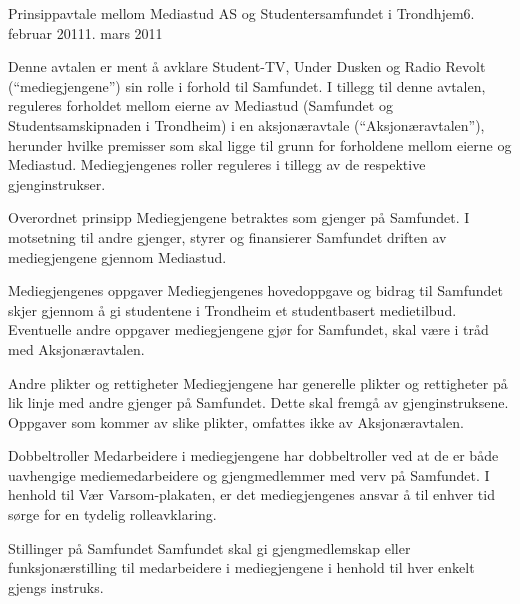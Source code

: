 \begin{instruks}{Prinsippavtale mellom Mediastud AS og Studentersamfundet i Trondhjem}{6. februar 2011}{1. mars 2011}


    Denne avtalen er ment å avklare Student-TV, Under Dusken og Radio Revolt
    (``mediegjengene'') sin rolle i forhold til Samfundet. I tillegg til denne avtalen, reguleres forholdet mellom
    eierne av Mediastud (Samfundet og Studentsamskipnaden i Trondheim) i en aksjonæravtale
    (``Aksjonæravtalen''), herunder hvilke premisser som skal ligge til grunn for forholdene mellom
    eierne og Mediastud. Mediegjengenes roller reguleres i tillegg av de respektive gjenginstrukser.


    \begin{instruksledd}{Overordnet prinsipp}
        Mediegjengene betraktes som gjenger på Samfundet. I motsetning til andre gjenger,
        styrer og finansierer Samfundet driften av mediegjengene gjennom Mediastud.  
    \end{instruksledd}

    \begin{instruksledd}{Mediegjengenes oppgaver}
        Mediegjengenes hovedoppgave og bidrag til Samfundet skjer gjennom å gi studentene i
        Trondheim et studentbasert medietilbud. Eventuelle andre oppgaver mediegjengene gjør for
        Samfundet, skal være i tråd med Aksjonæravtalen.  
    \end{instruksledd}        

    \begin{instruksledd}{Andre plikter og rettigheter}
        Mediegjengene har generelle plikter og rettigheter på lik linje med andre gjenger på
        Samfundet.  Dette skal fremgå av gjenginstruksene. Oppgaver som kommer av slike plikter, omfattes ikke
        av Aksjonæravtalen.  
    \end{instruksledd}

    \begin{instruksledd}{Dobbeltroller}
        Medarbeidere i mediegjengene har dobbeltroller ved at de er både uavhengige
        mediemedarbeidere
        og gjengmedlemmer med verv på Samfundet. I henhold til Vær Varsom-plakaten, er det
        mediegjengenes ansvar å til enhver tid sørge for en tydelig rolleavklaring.
    \end{instruksledd}


    \begin{instruksledd}{Stillinger på Samfundet}
        Samfundet skal gi gjengmedlemskap eller funksjonærstilling til medarbeidere i
        mediegjengene i henhold til hver enkelt gjengs instruks.
    \end{instruksledd}



\end{instruks}
